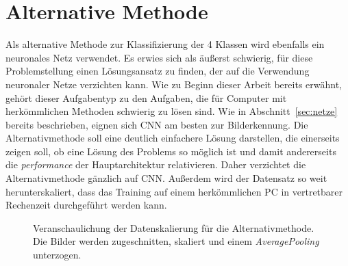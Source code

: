 \chapter{Alternative Methode}\label{sec:alter}

Als alternative Methode zur Klassifizierung der 4 Klassen wird ebenfalls ein
neuronales Netz verwendet. Es erwies sich als äußerst schwierig, für diese
Problemstellung einen Lösungsansatz zu finden, der auf die Verwendung
neuronaler Netze verzichten kann. Wie zu Beginn dieser Arbeit bereits erwähnt,
gehört dieser Aufgabentyp zu den Aufgaben, die für Computer mit herkömmlichen
Methoden schwierig zu lösen sind.
Wie in Abschnitt~\ref{sec:netze} bereits beschrieben, eignen sich CNN am besten
zur Bilderkennung. Die Alternativmethode soll eine deutlich einfachere Lösung
darstellen, die einerseits zeigen soll, ob eine Lösung des Problems so möglich
ist und damit andererseits die \textit{performance} der Hauptarchitektur
relativieren. Daher verzichtet die Alternativmethode gänzlich auf CNN.
Außerdem wird der Datensatz so weit herunterskaliert, dass das Training auf
einem herkömmlichen PC in vertretbarer Rechenzeit durchgeführt werden kann.
%
\begin{figure}[h!]
  \hspace{5pt}
  \caption{Veranschaulichung der Datenskalierung für die Alternativmethode. Die Bilder werden zugeschnitten, skaliert und einem \textit{AveragePooling} unterzogen.}
  \label{fig:alter}
\end{figure}

